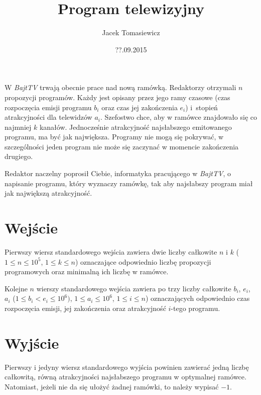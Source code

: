 \documentclass[zad,zawodnik,utf8]{sinol}
\title{Program telewizyjny}
\date{??.09.2015}
\author{Jacek Tomasiewicz}
\begin{document}
  \begin{tasktext}%
    W \textit{BajtTV} trwają obecnie prace nad nową ramówką. Redaktorzy otrzymali
    $n$ propozycji programów. Każdy jest opisany przez jego ramy czasowe
    (czas rozpoczęcia emisji programu $b_i$ oraz czas jej zakończenia $e_i$)
    i~stopień atrakcyjności dla telewidzów $a_i$. Szefostwo chce, aby w
    ramówce znajdowało się co najmniej $k$ kanałów. Jednocześnie atrakcyjność
    najsłabszego emitowanego programu, ma być jak największa. Programy nie mogą się pokrywać, w szczególności jeden program nie może się zaczynać w momencie zakończenia drugiego.

    Redaktor naczelny poprosił Ciebie, informatyka pracującego w \textit{BajtTV},
    o napisanie programu, który wyznaczy ramówkę, tak aby najsłabszy program
    miał jak największą atrakcyjność.

    \section{Wejście}
    Pierwszy wiersz standardowego wejścia zawiera dwie liczby całkowite $n$ i
    $k$ ($1 \leq n \leq 10^5$, $1 \leq k \leq n$) oznaczające odpowiednio
    liczbę propozycji programowych oraz minimalną ich liczbę w ramówce.

    Kolejne $n$ wierszy standardowego wejścia zawiera po trzy liczby całkowite
    $b_i$, $e_i$, $a_i$ ($1 \leq b_i < e_i \leq 10^6)$, $1 \leq a_i \leq 10^6$,
    $1 \leq i \leq n$) oznaczających odpowiednio czas rozpoczęcia emisji, jej
    zakończenia oraz atrakcyjność $i$-tego programu.

    \section{Wyjście}
    Pierwszy i jedyny wiersz standardowego wyjścia powinien zawierać jedną
    liczbę całkowitą, równą atrakcyjności najsłabszego programu w optymalnej
    ramówce. Natomiast, jeżeli nie da się ułożyć żadnej ramówki, to należy wypisać $-1$.

    \makecompactexample

  \end{tasktext}
\end{document}
